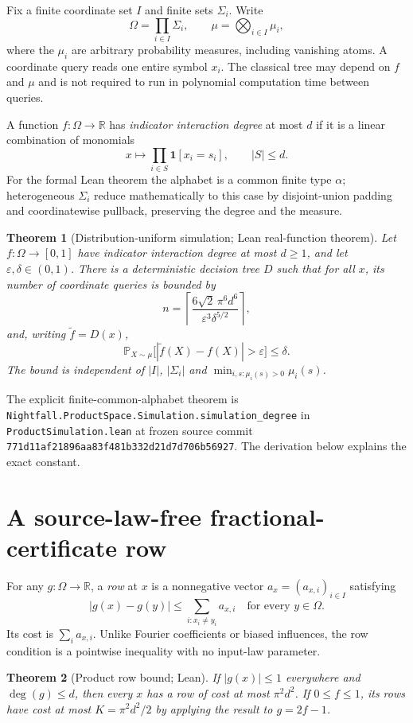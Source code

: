 \documentclass[11pt]{article}
\newtheorem{theorem}{Theorem}
\newcommand{\Prb}{\mathbb P}
\newcommand{\one}{\mathbf 1}
\begin{document}
Fix a finite coordinate set $I$ and finite sets $\Sigma_i$. Write
\[
\Omega=\prod_{i\in I}\Sigma_i,\qquad
\mu=\bigotimes_{i\in I}\mu_i,
\]
where the $\mu_i$ are arbitrary probability measures, including vanishing atoms. A coordinate query reads one entire symbol $x_i$. The classical tree may depend on $f$ and $\mu$ and is not required to run in polynomial computation time between queries.

A function $f:\Omega\to\mathbb R$ has \emph{indicator interaction degree} at most $d$ if it is a linear combination of monomials
\[
x\longmapsto \prod_{i\in S}\one[x_i=s_i], \qquad |S|\le d.
\]
For the formal Lean theorem the alphabet is a common finite type $\alpha$; heterogeneous $\Sigma_i$ reduce mathematically to this case by disjoint-union padding and coordinatewise pullback, preserving the degree and the measure.

\begin{theorem}[Distribution-uniform simulation; Lean real-function theorem]\label{thm:simulation}
Let $f:\Omega\to[0,1]$ have indicator interaction degree at most $d\ge1$, and let $\varepsilon,\delta\in(0,1)$. There is a deterministic decision tree $D$ such that for all $x$, its number of coordinate queries is bounded by
\[
n=\left\lceil\frac{6\sqrt2\,\pi^6d^6}{\varepsilon^3\delta^{5/2}}\right\rceil,
\]
and, writing $\widetilde f=D(x)$,
\[
\Prb_{X\sim\mu}\bigl[|\widetilde f(X)-f(X)|>\varepsilon\bigr]\le\delta.
\]
The bound is independent of $|I|$, $|\Sigma_i|$ and $\min_{i,s:\mu_i(s)>0}\mu_i(s)$.
\end{theorem}

The explicit finite-common-alphabet theorem is
\texttt{Nightfall.ProductSpace.Simulation.simulation\_degree}
in \texttt{ProductSimulation.lean} at frozen source commit \texttt{771d11af21896aa83f481b332d21d7d706b56927}. The derivation below explains the exact constant.

\section{A source-law-free fractional-certificate row}
For any $g:\Omega\to\mathbb R$, a \emph{row} at $x$ is a nonnegative vector $a_x=(a_{x,i})_{i\in I}$ satisfying
\[
|g(x)-g(y)|\le\sum_{i:x_i\ne y_i}a_{x,i}
\quad\text{for every }y\in\Omega.
\]
Its cost is $\sum_i a_{x,i}$. Unlike Fourier coefficients or biased influences, the row condition is a pointwise inequality with no input-law parameter.

\begin{theorem}[Product row bound; Lean]\label{thm:row}
If $|g(x)|\le1$ everywhere and $\deg(g)\le d$, then every $x$ has a row of cost at most $\pi^2d^2$.
If $0\le f\le1$, its rows have cost at most $K=\pi^2d^2/2$ by applying the result to $g=2f-1$.
\end{theorem}
\end{document}
